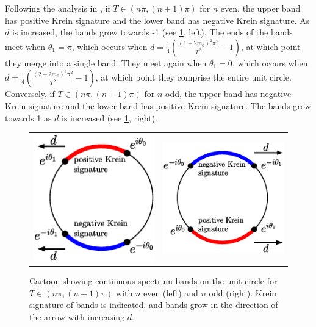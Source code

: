 \documentclass[12pt,reqno]{amsart}
\begin{document}
Following the analysis in \cite[Section 2.2]{cuevas-maraver2016}, if $T \in (n \pi, (n+1)\pi)$ for $n$ even, the upper band has positive Krein signature and the lower band has negative Krein signature. As $d$ is increased, the bands grow towards -1 (see \cref{fig:bands}, left). The ends of the bands meet when $\theta_1 = \pi$, which occurs when $d = \frac{1}{4} \left( \frac{(1 + 2 m_0)^2 \pi^2}{T^2} - 1\right)$, at which point they merge into a single band. They meet again when $\theta_1 = 0$, which occurs when $d = \frac{1}{4} \left( \frac{(2 + 2 m_0)^2 \pi^2}{T^2} - 1\right)$, at which point they comprise the entire unit circle.
Conversely, if $T \in (n \pi, (n+1)\pi)$ for $n$ odd, the upper band has negative Krein signature and the lower band has positive Krein signature. The bands grow towards 1 as $d$ is increased (see \cref{fig:bands}, right).

\begin{figure}
	\begin{center}
	\begin{tabular}{cc}
	\includegraphics[width=7.5cm]{contspeccartoon1.eps} &
	\includegraphics[width=7.5cm]{contspeccartoon2.eps}
	\end{tabular}
	\end{center}
	\caption{Cartoon showing continuous spectrum bands on the unit circle for $T \in (n \pi, (n+1)\pi)$ with $n$ even (left) and $n$ odd (right). Krein signature of bands is indicated, and bands grow in the direction of the arrow with increasing $d$.}
	\label{fig:bands}
\end{figure}
\end{document}
